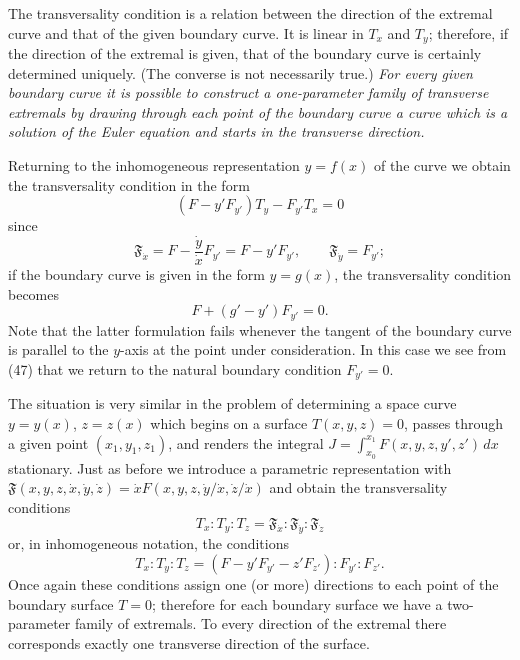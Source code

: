 The transversality condition is a relation between the direction of the extremal curve and that of the given boundary curve. It is linear in $T_x$ and $T_y$; therefore, if the direction of the extremal is given, that of the boundary curve is certainly determined uniquely. (The converse is not necessarily true.) \emph{For every given boundary curve it is possible to construct a one-parameter family of transverse extremals by drawing through each point of the boundary curve a curve which is a solution of the Euler equation and starts in the transverse direction.}

Returning to the inhomogeneous representation $y=f(x)$ of the curve we obtain the transversality condition in the form
\begin{equation}\tag{47}
(F-y'F_{y'})T_y-F_{y'}T_x=0
\end{equation}
since
\begin{equation}\tag{48}
\mathfrak F_{\dot x}=F-\frac{\dot y}{\dot x}F_{y'}=F-y'F_{y'},
\qquad
\mathfrak F_{\dot y}=F_{y'};
\end{equation}
if the boundary curve is given in the form $y=g(x)$, the transversality condition becomes
\[
F+(g'-y')F_{y'}=0.
\]
Note that the latter formulation fails whenever the tangent of the boundary curve is parallel to the $y$-axis at the point under consideration. In this case we see from (47) that we return to the natural boundary condition $F_{y'}=0$.

The situation is very similar in the problem of determining a space curve $y=y(x)$, $z=z(x)$ which begins on a surface $T(x,y,z)=0$, passes through a given point $(x_1,y_1,z_1)$, and renders the integral $J=\int_{x_0}^{x_1}F(x,y,z,y',z')\,dx$ stationary. Just as before we introduce a parametric representation with $\mathfrak F(x,y,z,\dot x,\dot y,\dot z)=\dot xF(x,y,z,\dot y/\dot x,\dot z/\dot x)$ and obtain the transversality conditions
\begin{equation}\tag{49}
T_x:T_y:T_z=\mathfrak F_{\dot x}:\mathfrak F_{\dot y}:\mathfrak F_{\dot z}
\end{equation}
or, in inhomogeneous notation, the conditions
\begin{equation}\tag{50}
T_x:T_y:T_z=(F-y'F_{y'}-z'F_{z'}):F_{y'}:F_{z'}.
\end{equation}
Once again these conditions assign one (or more) directions to each point of the boundary surface $T=0$; therefore for each boundary surface we have a two-parameter family of extremals. To every direction of the extremal there corresponds exactly one transverse direction of the surface.

